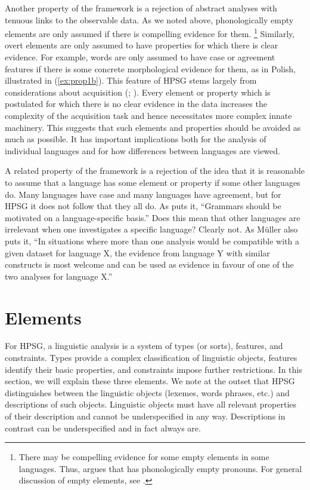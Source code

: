 \documentclass[output=paper
	        ,collection
	        ,collectionchapter
 	        ,biblatex
                ,babelshorthands
                ,newtxmath
                ,draftmode
                ,colorlinks, citecolor=brown
]{langscibook}
\begin{document}
Another property of the framework is a rejection of abstract analyses with tenuous links to the observable data. As we noted above, phonologically empty elements are only assumed if there is compelling evidence for them.%
%
\footnote{There may be compelling evidence for some empty elements in some languages. Thus, \citet[Section~8]{Borsley2009a-u} argues that  has phonologically empty pronouns. For general discussion of empty elements, see \citet[Chapter~19.2]{MuellerGT-Eng1}.}
%
Similarly, overt elements are only assumed to have properties for which there is clear evidence. For example, words are only assumed to have case or agreement features if there is some concrete morphological evidence for them, as in Polish, illustrated in (\ref{ex:prop1b}). This feature of HPSG stems largely from considerations about acquisition (\citealt[Chapter~19]{MuellerGT-Eng1}; %
). Every element or property which is postulated for which there is no clear evidence in the data increases the complexity of the acquisition task and hence necessitates more complex innate machinery. This suggests that such elements and properties should be avoided as much as possible. It has important implications both for the analysis of individual languages and for how differences between languages are viewed.
	
A related property of the framework is a rejection of the idea that it is reasonable to assume that a language has some element or property if some other languages do. Many languages have case and many languages have agreement, but for HPSG it does not follow that they all do. As \citet[25]{MuellerCoreGram} puts it, “Grammars should be motivated on a language-specific basis.” Does this mean that other languages are irrelevant when one investigates a specific language? Clearly not. As Müller also puts it, “In situations where more than one analysis would be compatible with a given dataset for language X, the evidence from language Y with similar constructs is most welcome and can be used as evidence in favour of one of the two analyses for language X.” \citep[43]{MuellerCoreGram}


\section{Elements}\label{sec:prop3}
\label{prop:sec-elements}

For HPSG, a linguistic analysis is a system of types (or sorts), features, and constraints. Types provide a complex classification of linguistic objects, features identify their basic properties, and constraints impose further restrictions. In this section, we will explain these three elements. We note at the outset that HPSG distinguishes between the linguistic objects (lexemes, words phrases, etc.) and descriptions of such objects. Linguistic objects must have all relevant properties of their description and cannot be underspecified in any way. Descriptions in contrast can be underspecified and in fact always are.
\end{document}
